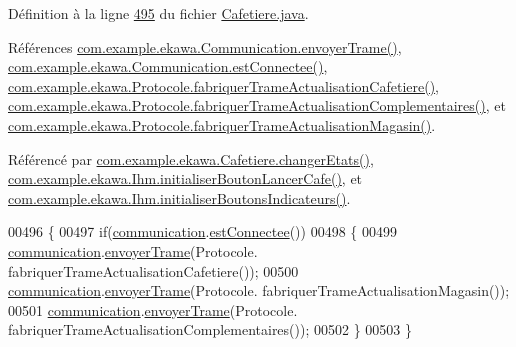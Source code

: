 Définition à la ligne \hyperlink{_cafetiere_8java_source_l00495}{495} du fichier \hyperlink{_cafetiere_8java_source}{Cafetiere.\+java}.



Références \hyperlink{_communication_8java_source_l00309}{com.\+example.\+ekawa.\+Communication.\+envoyer\+Trame()}, \hyperlink{_communication_8java_source_l00260}{com.\+example.\+ekawa.\+Communication.\+est\+Connectee()}, \hyperlink{_protocole_8java_source_l00145}{com.\+example.\+ekawa.\+Protocole.\+fabriquer\+Trame\+Actualisation\+Cafetiere()}, \hyperlink{_protocole_8java_source_l00165}{com.\+example.\+ekawa.\+Protocole.\+fabriquer\+Trame\+Actualisation\+Complementaires()}, et \hyperlink{_protocole_8java_source_l00155}{com.\+example.\+ekawa.\+Protocole.\+fabriquer\+Trame\+Actualisation\+Magasin()}.



Référencé par \hyperlink{_cafetiere_8java_source_l00463}{com.\+example.\+ekawa.\+Cafetiere.\+changer\+Etats()}, \hyperlink{_ihm_8java_source_l00526}{com.\+example.\+ekawa.\+Ihm.\+initialiser\+Bouton\+Lancer\+Cafe()}, et \hyperlink{_ihm_8java_source_l00357}{com.\+example.\+ekawa.\+Ihm.\+initialiser\+Boutons\+Indicateurs()}.


\begin{DoxyCode}
00496     \{
00497         \textcolor{keywordflow}{if}(\hyperlink{classcom_1_1example_1_1ekawa_1_1_cafetiere_af9506a7805d000d2cb83444cdb8ea889}{communication}.\hyperlink{classcom_1_1example_1_1ekawa_1_1_communication_a0c591a578528edaa5bb665cede5738bc}{estConnectee}())
00498         \{
00499             \hyperlink{classcom_1_1example_1_1ekawa_1_1_cafetiere_af9506a7805d000d2cb83444cdb8ea889}{communication}.\hyperlink{classcom_1_1example_1_1ekawa_1_1_communication_a98808d0236e547b9a3ee485f66aa7af0}{envoyerTrame}(Protocole.
      fabriquerTrameActualisationCafetiere());
00500             \hyperlink{classcom_1_1example_1_1ekawa_1_1_cafetiere_af9506a7805d000d2cb83444cdb8ea889}{communication}.\hyperlink{classcom_1_1example_1_1ekawa_1_1_communication_a98808d0236e547b9a3ee485f66aa7af0}{envoyerTrame}(Protocole.
      fabriquerTrameActualisationMagasin());
00501             \hyperlink{classcom_1_1example_1_1ekawa_1_1_cafetiere_af9506a7805d000d2cb83444cdb8ea889}{communication}.\hyperlink{classcom_1_1example_1_1ekawa_1_1_communication_a98808d0236e547b9a3ee485f66aa7af0}{envoyerTrame}(Protocole.
      fabriquerTrameActualisationComplementaires());
00502         \}
00503     \}
\end{DoxyCode}
\mbox{\label{classcom_1_1example_1_1ekawa_1_1_cafetiere_ad8c8b7d410315f55a216de809571fd87}} 
